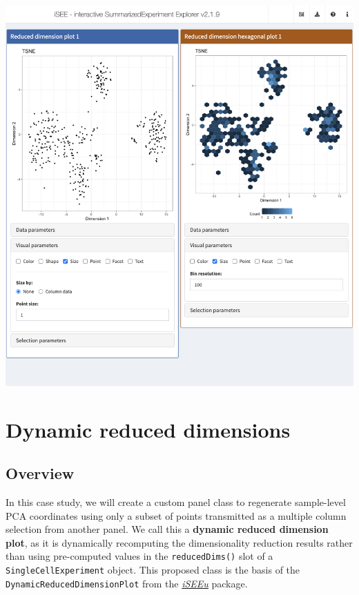 \documentclass[
]{book}
\begin{document}
\includegraphics[width=1\linewidth]{screenshots/hex-dimred}

\hypertarget{dynamic-reduced-dimensions}{%
\chapter{Dynamic reduced dimensions}\label{dynamic-reduced-dimensions}}

\hypertarget{overview}{%
\section{Overview}\label{overview}}

In this case study, we will create a custom panel class to regenerate sample-level PCA coordinates using only a subset of points transmitted as a multiple column selection from another panel.
We call this a \textbf{dynamic reduced dimension plot}, as it is dynamically recomputing the dimensionality reduction results rather than using pre-computed values in the \texttt{reducedDims()} slot of a \texttt{SingleCellExperiment} object.
This proposed class is the basis of the \texttt{DynamicReducedDimensionPlot} from the \emph{\href{https://bioconductor.org/packages/3.11/iSEEu}{iSEEu}} package.
\end{document}
